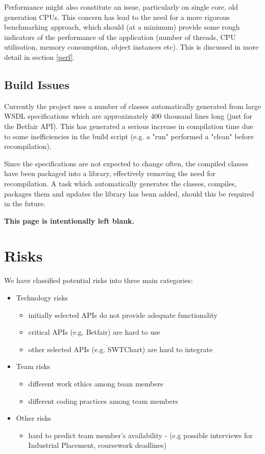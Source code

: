 \documentclass[10pt]{report}
\begin{document}
Performance might also constitute an issue, particularly on single core, old generation CPUs. This concern has lead to the need for a more rigorous benchmarking approach, which should (at a minimum) provide some rough indicators of the performance of the application (number of threads, CPU utilisation, memory consumption, object instances etc). This is discussed in more detail in section \ref{perf}.

\subsection{Build Issues}

Currently the project uses a number of classes automatically generated from large WSDL specifications which are approximately 400 thousand lines long (just for the Betfair API).
This has generated a serious increase in compilation time due to some inefficiencies in the build script (e.g. a "run" performed a "clean" before recompilation).

Since the specifications are not expected to change often, the compiled classes have been packaged into a library, effectively removing the need for recompilation.
A task which automatically generates the classes, compiles, packages them and updates the library has benn added, should this be required in the future.

\pagebreak
{\bf This page is intentionally left blank.}
\pagebreak

\section{Risks}

We have classified potential risks into three main categories:
\begin{itemize}
\item Technology risks
	\begin{itemize}
		\item initially selected APIs do not provide adequate functionality
		\item critical APIs (e.g. Betfair) are hard to use
		\item other selected APIs (e.g. SWTChart) are hard to integrate
	\end{itemize}

	\item Team risks
		\begin{itemize}
		\item different work ethics among team members
		\item different coding practices among team members
	\end{itemize}

	\item Other risks
		\begin{itemize}
		\item hard to predict team member's availability - (e.g possible interviews for Industrial Placement, coursework deadlines)
	\end{itemize}

\end{itemize}
\end{document}

